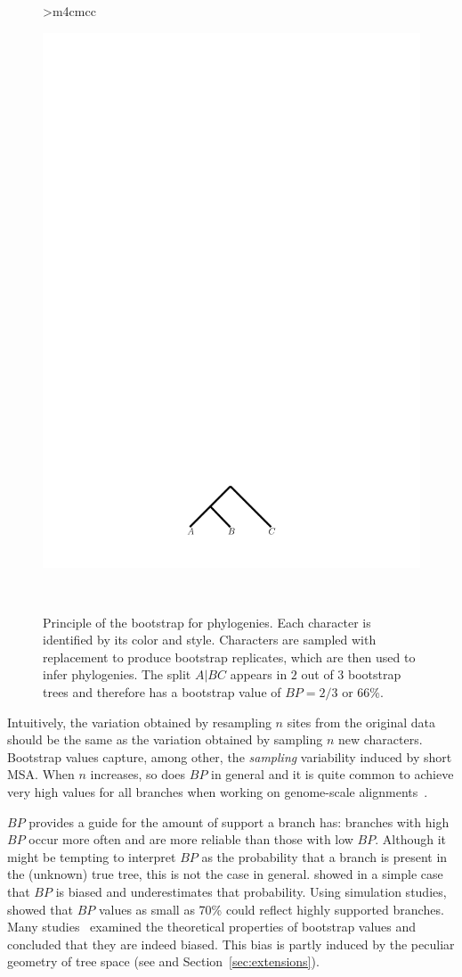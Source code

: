 \begin{figure}
\begin{center}
\begin{tabular}{>{\centering\arraybackslash}m{4cm}cc}
\begin{minipage}[c]{0.25\linewidth}
\begin{center}
              \includegraphics[width=0.6\linewidth]{Figs/TrueOne2.pdf}
            \end{center}
          \end{minipage}
          \\
	\end{tabular}
   \end{center}
   \caption{Principle of the bootstrap for phylogenies. Each character is identified by its color and style. Characters are sampled with replacement to produce bootstrap replicates, which are then used to infer phylogenies. The split $A|BC$ appears in $2$ out of $3$ bootstrap trees and therefore has a bootstrap value of $BP = 2/3$ or $66$\%.}
  \label{fig:bootstrap}
\end{figure}

Intuitively, the variation obtained by resampling $n$ sites from the original data should be the same as the variation obtained by sampling $n$ new characters. Bootstrap values capture, among other, the \emph{sampling} variability induced by short MSA. When $n$ increases, so does $BP$ in general and it is quite common to achieve very high values for all branches when working on genome-scale alignments~\citep{Rokas2003}. 

$BP$ provides a guide for the amount of support a branch has: branches with high $BP$ occur more often and are more reliable than those with low $BP$. Although it might be tempting to interpret $BP$ as the probability that a branch is present in the (unknown) true tree, this is not the case in general. \cite{Zharkikh1992} showed in a simple case that $BP$ is biased and underestimates that probability. Using simulation studies, \cite{Hillis1993} showed that $BP$ values as small as 70\% could reflect highly supported branches. Many studies~\citep{Felsenstein1993, Efron1996, Susko2008, Susko2010} examined the theoretical properties of bootstrap values and concluded that they are indeed biased. This bias is partly induced by the peculiar geometry of tree space (see \cite{Billera2001, Susko2010} and Section~\ref{sec:extensions}). 

